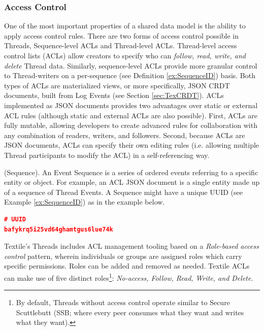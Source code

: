\documentclass{textile}
\begin{document}
\subsubsection{Access Control} \label{sec:AccessControl}

One of the most important properties of a shared data model is the ability to apply access control rules. There are two forms of access control possible in Threads, Sequence-level ACLs and Thread-level ACLs. Thread-level access control lists (ACLs) allow creators to specify who can \emph{follow, read, write, and delete} Thread data. Similarly, sequence-level ACLs provide more granular control to Thread-writers on a per-sequence (see Definition \ref{ex:SequenceID}) basis. Both types of ACLs are materialized views, or more specifically, JSON CRDT documents, built from Log Events (see Section \ref{sec:TexCRDT}). ACLs implemented as JSON documents provides two advantages over static or external ACL rules (although static and external ACLs are also possible). First, ACLs are fully mutable, allowing developers to create advanced rules for collaboration with any combination of readers, writers, and followers. Second, because ACLs are JSON documents, ACLs can specify their own editing rules (i.e. allowing multiple Thread participants to modify the ACL) in a self-referencing way.

\begin{definition}
(Sequence). An Event Sequence is a series of ordered events referring to a specific entity or object. For example, an ACL JSON document is a single entity made up of a sequence of Thread Events. A Sequence might have a unique UUID (see Example \ref{ex:SequenceID}) as in the example below.
\end{definition}

\begin{example}[!b]
\centering
\begin{lstlisting}[language=json,firstnumber=1]
# UUID
bafykrq5i25vd64ghamtgus6lue74k
\end{lstlisting}
  \caption{Sequence ID.}
  \label{ex:SequenceID}
\end{example}

Textile's Threads includes ACL management tooling based on a \emph{Role-based access control} \cite{sandhuRolebasedAccessControl1996} pattern, wherein individuals or groups are assigned roles which carry specific permissions. Roles can be added and removed as needed. Textile ACLs can make use of five distinct roles\footnote{By default, Threads without access control operate similar to Secure Scuttlebutt (SSB; where every peer consumes what they want and writes what they want).}: \emph{No-access, Follow, Read, Write, and Delete}.
\end{document}
